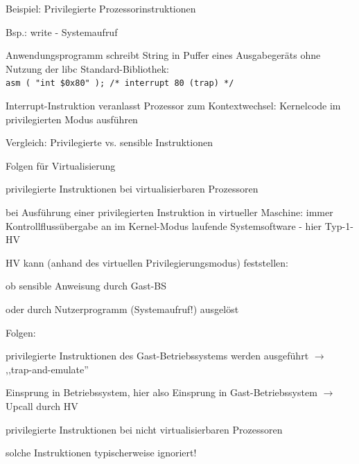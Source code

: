 \documentclass[a4paper]{article}
\begin{document}
\begin{multicols}{3}
\begin{itemize*}
        \item Beispiel: Privilegierte Prozessorinstruktionen
        \begin{itemize*}
            \item Bsp.: write - Systemaufruf
            \item Anwendungsprogramm schreibt String in Puffer eines Ausgabegeräts ohne Nutzung der libc Standard-Bibliothek: \texttt{asm\ (\ "int\ \$0x80"\ );\ /*\ interrupt\ 80\ (trap)\ */}
            \item Interrupt-Instruktion veranlasst Prozessor zum Kontextwechsel: Kernelcode im privilegierten Modus ausführen
        \end{itemize*}
    \end{itemize*}

    Vergleich: Privilegierte vs. sensible Instruktionen



    Folgen für Virtualisierung

    \begin{itemize*}
        \item privilegierte Instruktionen bei virtualisierbaren Prozessoren
        \item bei Ausführung einer privilegierten Instruktion in virtueller
        Maschine: immer Kontrollflussübergabe an im Kernel-Modus laufende
        Systemsoftware - hier Typ-1-HV
        \item HV kann (anhand des virtuellen Privilegierungsmodus) feststellen:
        \begin{enumerate*}

            \item ob sensible Anweisung durch Gast-BS
            \item oder durch Nutzerprogramm (Systemaufruf!) ausgelöst
        \end{enumerate*}
        \item Folgen:
        \begin{enumerate*}

            \item privilegierte Instruktionen des Gast-Betriebssystems werden ausgeführt $\rightarrow$ ,,trap-and-emulate''
            \item Einsprung in Betriebssystem, hier also Einsprung in Gast-Betriebssystem $\rightarrow$ Upcall durch HV
        \end{enumerate*}
        \item privilegierte Instruktionen bei nicht virtualisierbaren Prozessoren
        \begin{itemize*}
            \item solche Instruktionen typischerweise ignoriert!
        \end{itemize*}
    \end{itemize*}


\end{multicols}
\end{document}

